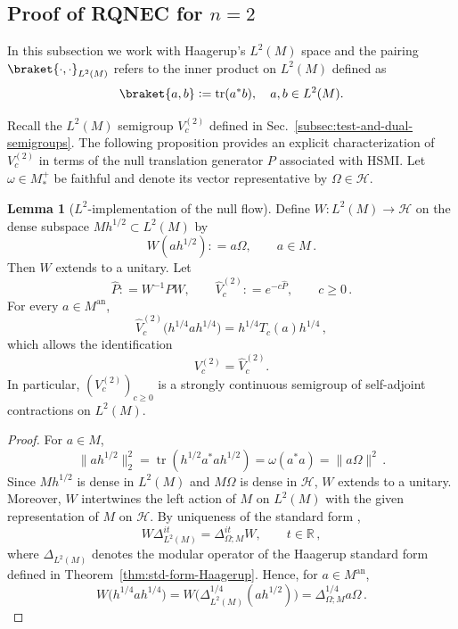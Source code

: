 \documentclass[11pt,a4paper]{article}
\theoremstyle{plain}
\numberwithin{theorem}{section}
\theoremstyle{definition}
\newtheorem{lemma}[theorem]{Lemma}
\newcommand{\?}{\overset{?}{=}}
\newcommand{\defeq}{\mathrel{\mathop:}=}
\DeclareMathOperator{\tr}{tr}
\begin{document}
\begin{appendix}
\subsection{Proof of RQNEC for \texorpdfstring{$n=2$}{n=2}}
In this subsection we work with Haagerup's $L^2(M)$ space and the pairing $\braket{\cdot,\cdot}_{L^2(M)}$ refers to the inner product on $L^2(M)$ defined as
\[
    \braket{a,b}\defeq \tr(a^*b), \quad a,b\in L^2(M). 
\]

Recall the $L^2(M)$ semigroup $V_c^{(2)}$ defined in Sec.~\ref{subsec:test-and-dual-semigroups}. The following proposition provides an explicit characterization of $V_c^{(2)}$ in terms of the null translation generator $P$ associated with HSMI. Let $\omega\in M_*^+$ be faithful and denote its vector representative by $\Omega\in \mathcal H$.

\begin{lemma}[\(L^2\)-implementation of the null flow]
\label{prop:standard-L2-implementation}
Define \(W : L^2(M) \to \mathcal H\) on the dense subspace \(M h^{1/2} \subset L^2(M)\) by
\[
W(a h^{1/2})  \defeq  a \Omega, \qquad a \in M \,.
\]
Then \(W\) extends to a unitary. Let
\[
\widehat{P}  \defeq  W^{-1} P W,
\qquad
\widehat{V}_c^{(2)}  \defeq  e^{-c \widehat{P}}, \qquad c \ge 0 \,.
\]
For every \(a \in M^{\mathrm{an}}\),
\[
\widehat{V}_c^{(2)}\big(h^{1/4} a h^{1/4}\big)
=
h^{1/4} T_c(a) h^{1/4}\,,
\]
which allows the identification
\[
    V_c^{(2)} = \widehat{V}_c^{(2)}.
\]
In particular, \((V_c^{(2)})_{c \ge 0}\) is a strongly continuous semigroup of self-adjoint contractions on
\(L^2(M)\).
\end{lemma}

\begin{proof}
For \(a \in M\),
\[
\|a h^{1/2}\|_2^2
=
\tr(h^{1/2} a^* a h^{1/2})
=
\omega(a^* a)
=
\|a \Omega\|^2\,.
\]
Since \(M h^{1/2}\) is dense in \(L^2(M)\) and \(M \Omega\) is dense in \(\mathcal H\), \(W\)
extends to a unitary. Moreover, \(W\) intertwines the left action of \(M\) on \(L^2(M)\) with
the given representation of \(M\) on \(\mathcal H\). By uniqueness of the standard form \cite{Haagerup1975},
\[
W \Delta_{L^2(M)}^{it} = \Delta_{\Omega;M}^{it} W, \qquad t \in \mathbb{R}\,,
\]
where \(\Delta_{L^2(M)}\) denotes the modular operator of the Haagerup standard form defined in Theorem~\ref{thm:std-form-Haagerup}. Hence, for
\(a \in M^{\mathrm{an}}\),
\[
W\big(h^{1/4} a h^{1/4}\big)
=
W\big(\Delta_{L^2(M)}^{1/4}(a h^{1/2})\big)
=
\Delta_{\Omega;M}^{1/4} a \Omega\,.
\]


\end{proof}
\end{appendix}
\end{document}
